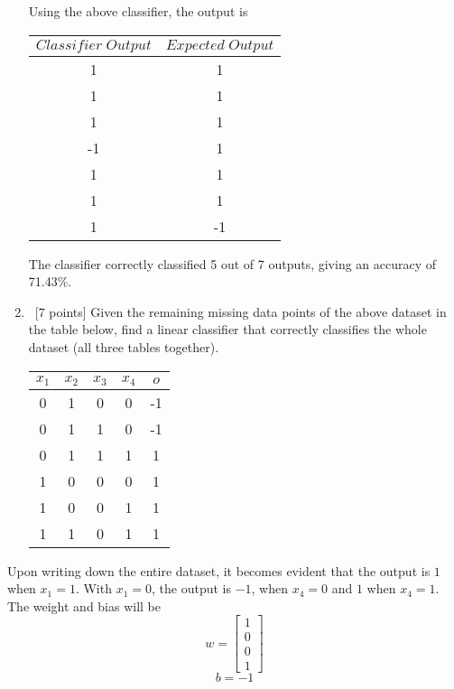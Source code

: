 \begin{enumerate}
Using the above classifier, the output is 
  \begin{center}
    \begin{tabular}{c|c}
      $Classifier \; Output$ & $Expected \; Output$ \\ \hline
      1 & 1 \\
      1 &  1 \\
       1 & 1 \\
       -1 & 1 \\
       1 & 1 \\
       1 &1 \\
      1 &-1 \\
    \end{tabular}
  \end{center}
  
  The classifier correctly classified 5 out of 7 outputs, giving an accuracy of 71.43\%.

\item ~[7 points] Given the remaining missing data points of the above dataset in the table below, find a linear classifier that correctly classifies the whole dataset (all three tables together). 
  \begin{center}
    \begin{tabular}{cccc|c}
      $x_1$ & $x_2$ & $x_3$ & $x_4$ & $o$ \\ \hline
      0 & 1 & 0 & 0 & -1\\
      0 & 1 & 1 & 0 & -1 \\
      0 & 1 & 1 & 1 & 1 \\
      1 & 0 & 0 & 0 & 1 \\
      1 & 0 & 0 & 1 & 1 \\
      1 & 1 & 0 & 1 & 1 \\
    \end{tabular}
  \end{center}
\end{enumerate}

Upon writing down the entire dataset, it becomes evident that the output is $1$ when $x_1 = 1$. With $x_1 = 0$, the output is $-1$, when $x_4=0$ and $1$ when $x_4=1$. The weight and bias will be
  \begin{equation*}
     w=\begin{bmatrix}
         1\\
         0 \\
         0\\
         1
        \end{bmatrix}
  \end{equation*}
  $$
  b=-1
  $$



